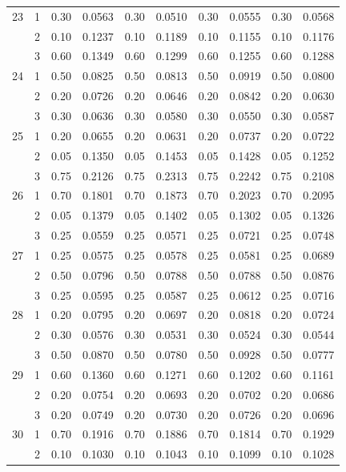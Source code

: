 \begin{longtable}{llcccccccc}
  23 & 1 & 0.30 & 0.0563 & 0.30 & 0.0510 & 0.30 & 0.0555 & 0.30 & 0.0568 \\ 
   & 2 & 0.10 & 0.1237 & 0.10 & 0.1189 & 0.10 & 0.1155 & 0.10 & 0.1176 \\ 
   & 3 & 0.60 & 0.1349 & 0.60 & 0.1299 & 0.60 & 0.1255 & 0.60 & 0.1288 \\ 
  24 & 1 & 0.50 & 0.0825 & 0.50 & 0.0813 & 0.50 & 0.0919 & 0.50 & 0.0800 \\ 
   & 2 & 0.20 & 0.0726 & 0.20 & 0.0646 & 0.20 & 0.0842 & 0.20 & 0.0630 \\ 
   & 3 & 0.30 & 0.0636 & 0.30 & 0.0580 & 0.30 & 0.0550 & 0.30 & 0.0587 \\ 
  25 & 1 & 0.20 & 0.0655 & 0.20 & 0.0631 & 0.20 & 0.0737 & 0.20 & 0.0722 \\ 
   & 2 & 0.05 & 0.1350 & 0.05 & 0.1453 & 0.05 & 0.1428 & 0.05 & 0.1252 \\ 
   & 3 & 0.75 & 0.2126 & 0.75 & 0.2313 & 0.75 & 0.2242 & 0.75 & 0.2108 \\ 
  26 & 1 & 0.70 & 0.1801 & 0.70 & 0.1873 & 0.70 & 0.2023 & 0.70 & 0.2095 \\ 
   & 2 & 0.05 & 0.1379 & 0.05 & 0.1402 & 0.05 & 0.1302 & 0.05 & 0.1326 \\ 
   & 3 & 0.25 & 0.0559 & 0.25 & 0.0571 & 0.25 & 0.0721 & 0.25 & 0.0748 \\ 
  27 & 1 & 0.25 & 0.0575 & 0.25 & 0.0578 & 0.25 & 0.0581 & 0.25 & 0.0689 \\ 
   & 2 & 0.50 & 0.0796 & 0.50 & 0.0788 & 0.50 & 0.0788 & 0.50 & 0.0876 \\ 
   & 3 & 0.25 & 0.0595 & 0.25 & 0.0587 & 0.25 & 0.0612 & 0.25 & 0.0716 \\ 
  28 & 1 & 0.20 & 0.0795 & 0.20 & 0.0697 & 0.20 & 0.0818 & 0.20 & 0.0724 \\ 
   & 2 & 0.30 & 0.0576 & 0.30 & 0.0531 & 0.30 & 0.0524 & 0.30 & 0.0544 \\ 
   & 3 & 0.50 & 0.0870 & 0.50 & 0.0780 & 0.50 & 0.0928 & 0.50 & 0.0777 \\ 
  29 & 1 & 0.60 & 0.1360 & 0.60 & 0.1271 & 0.60 & 0.1202 & 0.60 & 0.1161 \\ 
   & 2 & 0.20 & 0.0754 & 0.20 & 0.0693 & 0.20 & 0.0702 & 0.20 & 0.0686 \\ 
   & 3 & 0.20 & 0.0749 & 0.20 & 0.0730 & 0.20 & 0.0726 & 0.20 & 0.0696 \\ 
  30 & 1 & 0.70 & 0.1916 & 0.70 & 0.1886 & 0.70 & 0.1814 & 0.70 & 0.1929 \\ 
   & 2 & 0.10 & 0.1030 & 0.10 & 0.1043 & 0.10 & 0.1099 & 0.10 & 0.1028 \\ 

\end{longtable}

